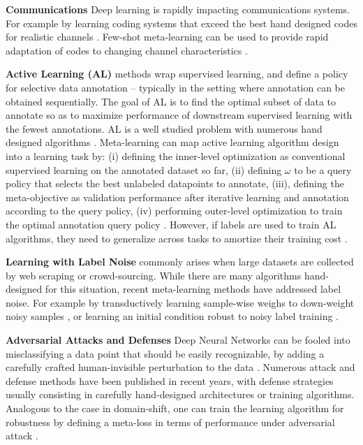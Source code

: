 \documentclass[10pt,journal,compsoc]{IEEEtran}
\newcommand{\keypoint}[1]{\vspace{0.1cm}\noindent\textbf{#1}\quad}
\begin{document}
\keypoint{Communications} Deep learning is rapidly impacting communications systems. For example by learning coding systems that exceed the best hand designed codes for realistic channels \cite{oshea2017drlphysical}. Few-shot meta-learning can be used to provide rapid  adaptation of codes to changing channel characteristics \cite{jiang2019mind}.

\keypoint{Active Learning (AL)} methods
wrap supervised learning, and define a policy for selective data annotation -- typically in the setting where annotation can be obtained sequentially. The goal of AL is to find the optimal subset of data to annotate so as to maximize performance of downstream supervised learning with the fewest annotations. AL is a well studied problem with numerous hand designed algorithms \cite{settles2012activelearning}. Meta-learning can map active learning algorithm design into a learning task by: (i) defining the inner-level optimization as conventional supervised learning on the annotated dataset so far, (ii) defining $\omega$ to be a query policy that selects the best unlabeled datapoints to annotate, (iii), defining the meta-objective as validation performance after iterative learning and annotation according to the query policy, (iv) performing outer-level optimization to train the optimal annotation query policy \cite{pang2018metatransferal,bachman2017laalicml,konyushkova2017learning}. However, if labels are used to train AL algorithms, they need to generalize across tasks to amortize their training cost \cite{pang2018metatransferal}.

\keypoint{Learning with Label Noise} commonly arises when large datasets are collected by web scraping or crowd-sourcing. While there are many algorithms hand-designed for this situation, recent meta-learning methods have addressed label noise. For example by transductively learning sample-wise weighs to down-weight noisy samples \cite{shu2019metaweightnet}, or learning an initial condition robust to noisy label training \cite{li2019learning}.

\keypoint{Adversarial Attacks and Defenses}
Deep Neural Networks can be fooled into misclassifying a data point that should be easily recognizable, by adding a carefully crafted human-invisible perturbation to the data \cite{goodfellow2015adversarialexamples}. Numerous attack and defense methods have been published in recent years, with defense strategies usually consisting in carefully hand-designed architectures or training algorithms. Analogous to the case in domain-shift, one can train the learning algorithm for robustness by defining a meta-loss in terms of performance under adversarial attack \cite{goldblum2019adversarially,yin2018advmeta}.  
\end{document}
